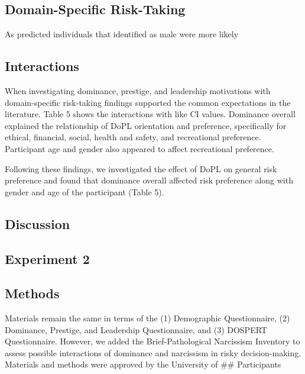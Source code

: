 \documentclass[
  donotrepeattitle,doc, 12pt, a4paper,floatsintext]{apa7}
\begin{document}
\hypertarget{domain-specific-risk-taking-1}{%
\subsection{Domain-Specific Risk-Taking}\label{domain-specific-risk-taking-1}}

As predicted individuals that identified as male were more likely

\hypertarget{interactions-1}{%
\subsection{Interactions}\label{interactions-1}}

When investigating dominance, prestige, and leadership motivations with domain-specific risk-taking findings supported the common expectations in the literature. Table 5 shows the interactions with like CI values. Dominance overall explained the relationship of DoPL orientation and preference, specifically for ethical, financial, social, health and safety, and recreational preference. Participant age and gender also appeared to affect recreational preference.

Following these findings, we investigated the effect of DoPL on general risk preference and found that dominance overall affected risk preference along with gender and age of the participant (Table 5).

\hypertarget{discussion-1}{%
\subsection{Discussion}\label{discussion-1}}

\hypertarget{experiment-2-1}{%
\subsection{Experiment 2}\label{experiment-2-1}}

\hypertarget{methods-1}{%
\subsection{Methods}\label{methods-1}}

Materials remain the same in terms of the (1) Demographic Questionnaire, (2) Dominance, Prestige, and Leadership Questionnaire, and (3) DOSPERT Questionnaire. However, we added the Brief-Pathological Narcissism Inventory to assess possible interactions of dominance and narcissism in risky decision-making. Materials and methods were approved by the University of
\#\# Participants
\end{document}
